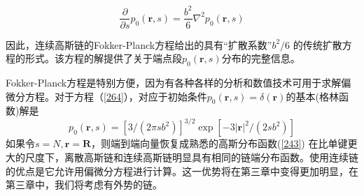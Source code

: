 \begin{equation}\label{264}
\frac{\partial}{\partial s}p_0(\mathbf{r},s)=\frac{b^2}{6}\nabla ^2 p_0(\mathbf{r},s) 
\end{equation}

因此，连续高斯链的Fokker-Planck方程给出的具有“扩散系数”$b^2/6$
的传统扩散方程的形式。该方程的解提供了关于端点段$p_0(\mathbf{r},s)$分布的完整信息。

Fokker-Planck方程是特别方便，因为有各种各样的分析和数值技术可用于求解偏微分方程。对于方程（\ref{264}），对应于初始条件$p_0(\mathbf{r},s)=\delta(\mathbf{r})$的基本(格林函数)解是
\begin{equation}\label{265}
p_0(\mathbf{r},s)=\left[ 3/(2 \pi sb^2) \right]^{3/2}\exp \left[ -3\left| \mathbf{r} \right|^2/(2sb^2) \right]
\end{equation}
如果令$s=N,\mathbf{r}=\mathbf{R}$，则端到端向量恢复成熟悉的高斯分布函数(\ref{243})
在比单键更大的尺度下，离散高斯链和连续高斯链明显具有相同的链端分布函数。使用连续链的优点是它允许用偏微分方程进行计算。这一优势将在第三章中变得更加明显，在第三章中，我们将考虑有外势的链。
\endinput